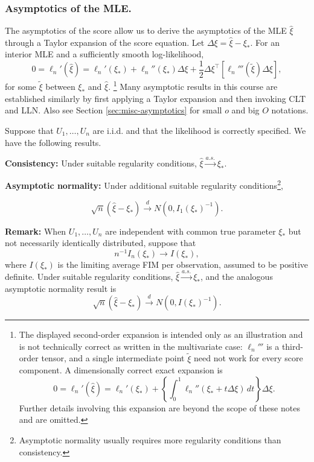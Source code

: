 \documentclass{article}
\newenvironment{mybox}{%
  \par\addvspace{10pt}%
  \begin{mdframed}[skipabove=0pt,skipbelow=10pt]%
}{%
  \end{mdframed}%
}
\theoremstyle{break}
\begin{document}
\subsubsection{Asymptotics of the MLE.}
The asymptotics of the score allow us to derive the asymptotics of the MLE $\hat\xi$ through a Taylor expansion of the score equation. Let $\Delta\xi=\hat\xi-\xi_*$. For an interior MLE and a sufficiently smooth log-likelihood,
\[
    0
    =\ell_n'(\hat\xi)
    =\ell_n'(\xi_*)
    +\ell_n''(\xi_*)\Delta\xi
    +\frac{1}{2}\Delta\xi^\top
      \left[\ell_n'''(\tilde\xi)\Delta\xi\right],
\]
for some $\tilde\xi$ between $\xi_*$ and $\hat\xi$. 
\footnote{The displayed second-order expansion is intended only as an illustration and is not technically correct as written in the multivariate case: $\ell_n'''$ is a third-order tensor, and a single intermediate point $\tilde\xi$ need not work for every score component. A dimensionally correct exact expansion is
\[
    0
    =\ell_n'(\hat\xi)
    =\ell_n'(\xi_*)
    +\left\{\int_0^1\ell_n''(\xi_*+t\Delta\xi)\,dt\right\}\Delta\xi.
\]
Further details involving this expansion are beyond the scope of these notes and are omitted.
}
Many asymptotic results in this course are established similarly by first applying a Taylor expansion and then invoking CLT and LLN. Also see Section \ref{sec:misc-asymptotics} for small $o$ and big $O$ notations.

Suppose that $U_1,\ldots,U_n$ are i.i.d. and that the likelihood is correctly specified. We have the following results.

\textbf{Consistency:} Under suitable regularity conditions, $\hat{\xi} \stackrel{a.s.}{\to} \xi_*$.

\textbf{Asymptotic normality:} Under additional suitable regularity conditions\footnote{Asymptotic normality usually requires more regularity conditions than consistency.},
\begin{mybox}
\begin{equation}\label{eq:mle-clt}
    \sqrt{n}(\hat{\xi}-\xi_*)
    \stackrel{d}{\rightarrow}
    N\left(0,I_{1}(\xi_*)^{-1}\right).
\end{equation}
\end{mybox}

\textbf{Remark:} When $U_1,\ldots,U_n$ are independent with common true parameter $\xi_*$ but not necessarily identically distributed, suppose that
\[
    n^{-1}I_n(\xi_*)\to I(\xi_*),
\]
where $I(\xi_*)$ is the limiting average FIM per observation, assumed to be positive definite. Under suitable regularity conditions, $\hat\xi \stackrel{a.s.}{\to} \xi_*$, and the analogous asymptotic normality result is
\[
    \sqrt{n}(\hat{\xi}-\xi_*)
    \stackrel{d}{\rightarrow}
    N\left(0,I(\xi_*)^{-1}\right).
\]
\end{document}
